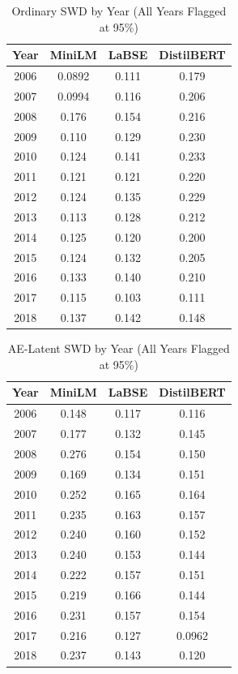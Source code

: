 \documentclass[conference]{IEEEtran}
\begin{document}
\begin{table}[htbp]
\caption{Ordinary SWD by Year (All Years Flagged at 95\%)}
\label{tab:ordinary_swd_yearly}
\begin{center}
\begin{tabular}{|c|c|c|c|}
\hline
\textbf{Year} & \textbf{MiniLM} & \textbf{LaBSE} & \textbf{DistilBERT} \\
\hline
2006 & 0.0892 & 0.111 & 0.179 \\
2007 & 0.0994 & 0.116 & 0.206 \\
2008 & 0.176 & 0.154 & 0.216 \\
2009 & 0.110 & 0.129 & 0.230 \\
2010 & 0.124 & 0.141 & 0.233 \\
2011 & 0.121 & 0.121 & 0.220 \\
2012 & 0.124 & 0.135 & 0.229 \\
2013 & 0.113 & 0.128 & 0.212 \\
2014 & 0.125 & 0.120 & 0.200 \\
2015 & 0.124 & 0.132 & 0.205 \\
2016 & 0.133 & 0.140 & 0.210 \\
2017 & 0.115 & 0.103 & 0.111 \\
2018 & 0.137 & 0.142 & 0.148 \\
\hline
\end{tabular}
\end{center}
\end{table}

\begin{table}[htbp]
\caption{AE-Latent SWD by Year (All Years Flagged at 95\%)}
\label{tab:latent_swd_yearly}
\begin{center}
\begin{tabular}{|c|c|c|c|}
\hline
\textbf{Year} & \textbf{MiniLM} & \textbf{LaBSE} & \textbf{DistilBERT} \\
\hline
2006 & 0.148 & 0.117 & 0.116 \\
2007 & 0.177 & 0.132 & 0.145 \\
2008 & 0.276 & 0.154 & 0.150 \\
2009 & 0.169 & 0.134 & 0.151 \\
2010 & 0.252 & 0.165 & 0.164 \\
2011 & 0.235 & 0.163 & 0.157 \\
2012 & 0.240 & 0.160 & 0.152 \\
2013 & 0.240 & 0.153 & 0.144 \\
2014 & 0.222 & 0.157 & 0.151 \\
2015 & 0.219 & 0.166 & 0.144 \\
2016 & 0.231 & 0.157 & 0.154 \\
2017 & 0.216 & 0.127 & 0.0962 \\
2018 & 0.237 & 0.143 & 0.120 \\
\hline
\end{tabular}
\end{center}
\end{table}
\end{document}
